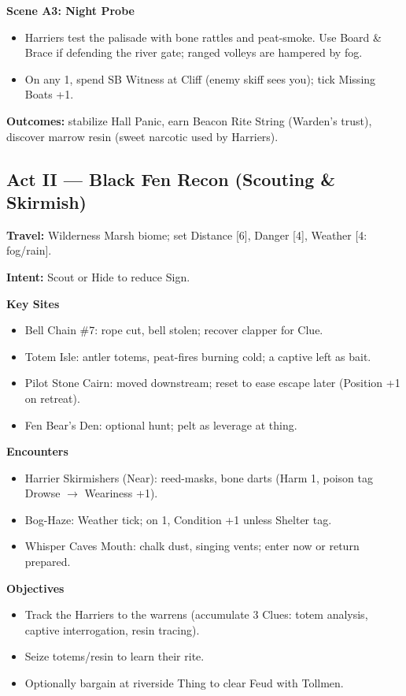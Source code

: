\documentclass[11pt]{article}
\begin{document}
\textbf{Scene A3: Night Probe}
\begin{itemize}
\item Harriers test the palisade with bone rattles and peat-smoke. Use Board \& Brace if defending the river gate; ranged volleys are hampered by fog.
\item On any 1, spend SB Witness at Cliff (enemy skiff sees you); tick Missing Boats +1.
\end{itemize}

\textbf{Outcomes:} stabilize Hall Panic, earn Beacon Rite String (Warden's trust), discover marrow resin (sweet narcotic used by Harriers).

\subsection{Act II --- Black Fen Recon (Scouting \& Skirmish)}

\textbf{Travel:} Wilderness Marsh biome; set Distance [6], Danger [4], Weather [4: fog/rain].

\textbf{Intent:} Scout or Hide to reduce Sign.

\textbf{Key Sites}
\begin{itemize}
\item Bell Chain \#7: rope cut, bell stolen; recover clapper for Clue.
\item Totem Isle: antler totems, peat-fires burning cold; a captive left as bait.
\item Pilot Stone Cairn: moved downstream; reset to ease escape later (Position +1 on retreat).
\item Fen Bear's Den: optional hunt; pelt as leverage at thing.
\end{itemize}

\textbf{Encounters}
\begin{itemize}
\item Harrier Skirmishers (Near): reed-masks, bone darts (Harm 1, poison tag Drowse $\rightarrow$ Weariness +1).
\item Bog-Haze: Weather tick; on 1, Condition +1 unless Shelter tag.
\item Whisper Caves Mouth: chalk dust, singing vents; enter now or return prepared.
\end{itemize}

\textbf{Objectives}
\begin{itemize}
\item Track the Harriers to the warrens (accumulate 3 Clues: totem analysis, captive interrogation, resin tracing).
\item Seize totems/resin to learn their rite.
\item Optionally bargain at riverside Thing to clear Feud with Tollmen.
\end{itemize}
\end{document}
